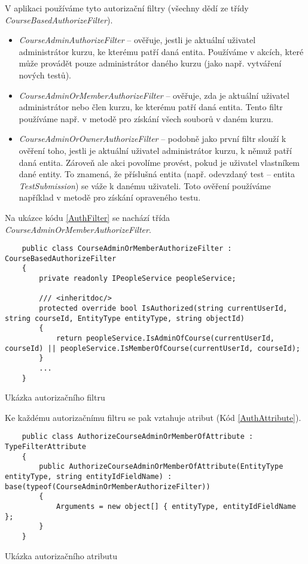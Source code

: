 V aplikaci používáme tyto autorizační filtry (všechny dědí ze třídy \textit{CourseBasedAuthorizeFilter}).
\begin{itemize}
	\item \textit{CourseAdminAuthorizeFilter} -- ověřuje, jestli je aktuální uživatel administrátor kurzu, ke kterému patří daná entita. Používáme v akcích, které může provádět pouze administrátor daného kurzu (jako např. vytváření nových testů).
	\item \textit{CourseAdminOrMemberAuthorizeFilter} -- ověřuje, zda je aktuální uživatel administrátor nebo člen kurzu, ke kterému patří daná entita. Tento filtr používáme např. v metodě pro získání všech souborů v daném kurzu.
	\item \textit{CourseAdminOrOwnerAuthorizeFilter} -- podobně jako první filtr slouží k ověření toho, jestli je aktuální uživatel administrátor kurzu, k němuž patří daná entita. Zároveň ale akci povolíme provést, pokud je uživatel vlastníkem dané entity. To znamená, že příslušná entita (např. odevzdaný test -- entita \textit{TestSubmission}) se váže k danému uživateli. Toto ověření používáme například v metodě pro získání opraveného testu.
\end{itemize}

Na ukázce kódu \ref{AuthFilter} se nachází třída \textit{CourseAdminOrMemberAuthorizeFilter}.

\begin{program}
	\begin{lstlisting}
	public class CourseAdminOrMemberAuthorizeFilter : CourseBasedAuthorizeFilter
	{
		private readonly IPeopleService peopleService;
		
		/// <inheritdoc/>
		protected override bool IsAuthorized(string currentUserId, string courseId, EntityType entityType, string objectId)
		{
			return peopleService.IsAdminOfCourse(currentUserId, courseId) || peopleService.IsMemberOfCourse(currentUserId, courseId);
		}
		...
	}
	\end{lstlisting}
	\caption{Ukázka autorizačního filtru}
	\label{AuthFilter}
\end{program}

Ke každému autorizačnímu filtru se pak vztahuje atribut (Kód \ref{AuthAttribute}).

\begin{program}
	\begin{lstlisting}
	public class AuthorizeCourseAdminOrMemberOfAttribute : TypeFilterAttribute
	{
		public AuthorizeCourseAdminOrMemberOfAttribute(EntityType entityType, string entityIdFieldName) : base(typeof(CourseAdminOrMemberAuthorizeFilter))
		{
			Arguments = new object[] { entityType, entityIdFieldName };
		}
	}
	\end{lstlisting}
	\caption{Ukázka autorizačního atributu}
	\label{AuthAttribute}
\end{program}

